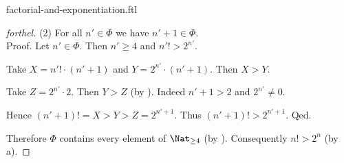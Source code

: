 \documentclass{naproche-library}
\begin{document}
\begin{smodule}{factorial-and-exponentiation.ftl}
\begin{proof}[forthel]
    (2) For all $n' \in \Phi$ we have $n' + 1 \in \Phi$. \\
    Proof.
      Let $n' \in \Phi$.
      Then $n' \geq 4$ and $n'! > 2^{n'}$.

      Take $X = n'! \cdot (n' + 1)$ and $Y = 2^{n'} \cdot (n' + 1)$.
      Then $X > Y$.

      Take $Z = 2^{n'} \cdot 2$.
      Then $Y > Z$ (by ).
      Indeed $n' + 1 > 2$ and $2^{n'} \neq 0$.

      Hence $(n' + 1)! = X > Y > Z = 2^{n' + 1}$.
      Thus $(n' + 1)! > 2^{n' + 1}$.
    Qed.

    Therefore $\Phi$ contains every element of $\Nat_{\geq 4}$ (by ).
    Consequently $n! > 2^{n}$ (by a).
  \end{proof}
\end{smodule}
\end{document}
